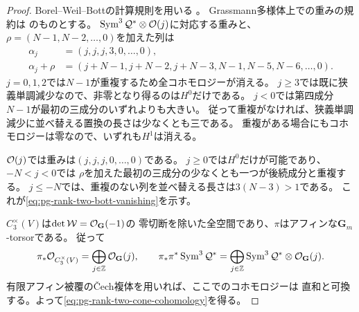 \begin{proof}
Borel--Weil--Bottの計算規則を用いる
\cite[Theorem~5, p.~3]{PLurieBWB}。
Grassmann多様体上での重みの規約は
\cite[\S2.2, Theorem~2.3, pp.~5--6]{PGuoLuSharpe}のものとする。
$\operatorname{Sym}^3\mathcal Q^*\otimes\mathcal O(j)$に対応する重みと、
$\rho=(N-1,N-2,\ldots,0)$を加えた列は
\begin{equation}
 \begin{aligned}
 \alpha_j&=(j,j,j,3,0,\ldots,0),\\
 \alpha_j+\rho
   &=(j+N-1,j+N-2,j+N-3,N-1,N-5,N-6,\ldots,0).
 \end{aligned}
 \label{eq:pg-rank-two-bott-weights}
\end{equation}
$j=0,1,2$では$N-1$が重複するため全コホモロジーが消える。
$j\ge3$では既に狭義単調減少なので、非零となり得るのは$H^0$だけである。
$j<0$では第四成分$N-1$が最初の三成分のいずれよりも大きい。
従って重複がなければ、狭義単調減少に並べ替える置換の長さは少なくとも三である。
重複がある場合にもコホモロジーは零なので、いずれも$H^1$は消える。

$\mathcal O(j)$では重みは$(j,j,j,0,\ldots,0)$である。
$j\ge0$では$H^0$だけが可能であり、$-N<j<0$では
$\rho$を加えた最初の三成分の少なくとも一つが後続成分と重複する。
$j\le-N$では、重複のない列を並べ替える長さは$3(N-3)>1$である。
これが\eqref{eq:pg-rank-two-bott-vanishing}を示す。

$C_3^\times(V)$は$\det\mathcal W=\mathcal O_{\mathbf G}(-1)$の
零切断を除いた全空間であり、$\pi$はアフィンな$\mathbf G_m$-torsorである。
従って
\begin{equation}
 \pi_*\mathcal O_{C_3^\times(V)}
    =\bigoplus_{j\in\mathbb Z}\mathcal O_{\mathbf G}(j),\qquad
 \pi_*\pi^*\operatorname{Sym}^3\mathcal Q^*
    =\bigoplus_{j\in\mathbb Z}
      \operatorname{Sym}^3\mathcal Q^*\otimes\mathcal O_{\mathbf G}(j).
 \label{eq:pg-rank-two-cone-direct-images}
\end{equation}
有限アフィン被覆の\v{C}ech複体を用いれば、ここでのコホモロジーは
直和と可換する。よって\eqref{eq:pg-rank-two-cone-cohomology}を得る。
\end{proof}

